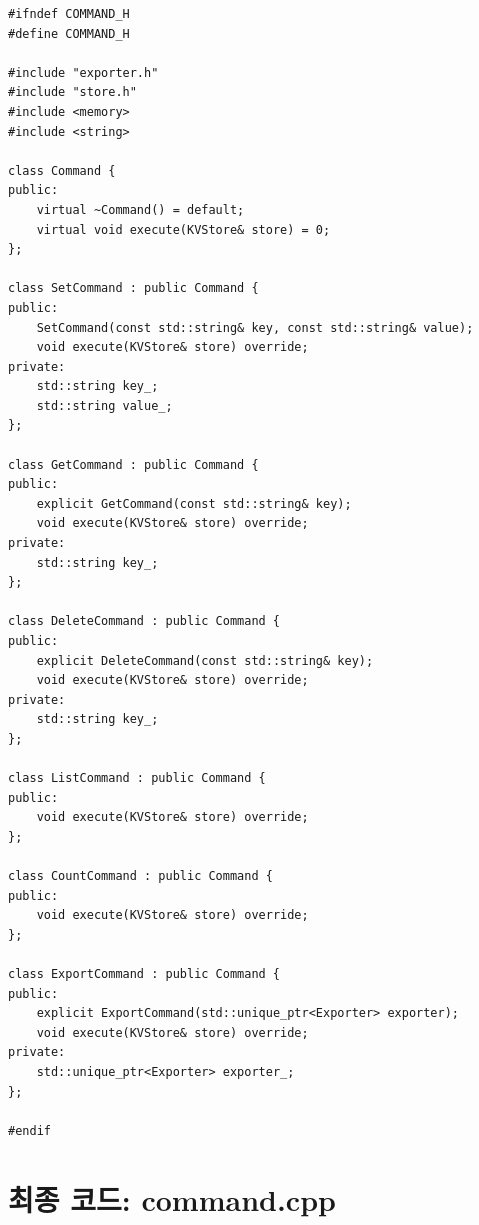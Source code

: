 \documentclass[11pt,a4paper]{book}
\newcommand{\file}[1]{\texttt{#1}}
\begin{document}
\begin{lstlisting}[style=cpp,title={\file{src/command.h} (최종)}]
#ifndef COMMAND_H
#define COMMAND_H

#include "exporter.h"
#include "store.h"
#include <memory>
#include <string>

class Command {
public:
    virtual ~Command() = default;
    virtual void execute(KVStore& store) = 0;
};

class SetCommand : public Command {
public:
    SetCommand(const std::string& key, const std::string& value);
    void execute(KVStore& store) override;
private:
    std::string key_;
    std::string value_;
};

class GetCommand : public Command {
public:
    explicit GetCommand(const std::string& key);
    void execute(KVStore& store) override;
private:
    std::string key_;
};

class DeleteCommand : public Command {
public:
    explicit DeleteCommand(const std::string& key);
    void execute(KVStore& store) override;
private:
    std::string key_;
};

class ListCommand : public Command {
public:
    void execute(KVStore& store) override;
};

class CountCommand : public Command {
public:
    void execute(KVStore& store) override;
};

class ExportCommand : public Command {
public:
    explicit ExportCommand(std::unique_ptr<Exporter> exporter);
    void execute(KVStore& store) override;
private:
    std::unique_ptr<Exporter> exporter_;
};

#endif
\end{lstlisting}

\section{최종 코드: command.cpp}
\end{document}
